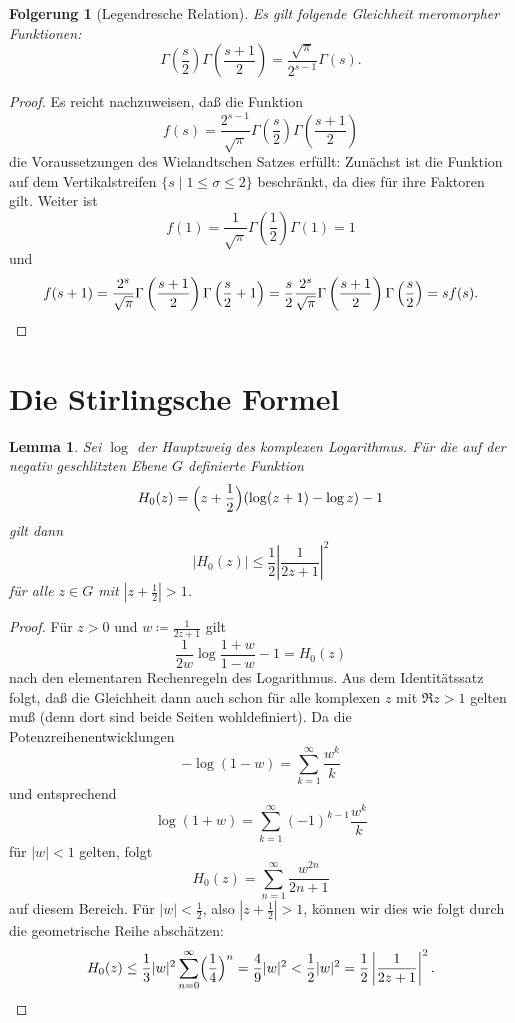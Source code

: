 \documentclass[a4paper,twoside,openright]{report}
\newtheorem{lem}[thm]{Lemma}
\newtheorem{cor}[thm]{Folgerung}
\theoremstyle{definition}
\theoremstyle{remark}
\begin{document}
\begin{cor}[Legendresche Relation]
  Es gilt folgende Gleichheit meromorpher Funktionen:
  \[
    \Gamma\left(\frac s 2\right) \Gamma\left(\frac{s + 1} 2\right) = \frac{\sqrt\pi}{2^{s - 1}} \Gamma(s).
  \]
\end{cor}

\begin{proof}
  Es reicht nachzuweisen, daß die Funktion
  \[
    f(s) = \frac{2^{s - 1}}{\sqrt{\pi}} \Gamma\left(\frac s 2\right) \Gamma\left(\frac{s + 1} 2\right)
  \]
  die Voraussetzungen des Wielandtschen Satzes erfüllt: Zunächst ist die Funktion
  auf dem Vertikalstreifen $\{s \mid 1 \leq \sigma \leq 2\}$ beschränkt, da dies
  für ihre Faktoren gilt. Weiter ist
  \[
    f(1) = \frac 1 {\sqrt\pi} \Gamma\left(\frac 1 2\right) \Gamma(1) = 1
  \]
  und
  \[
    f(s + 1) = \frac{2^s}{\sqrt{\pi}} \Gamma\left(\frac {s + 1} 2\right)
    \Gamma\left(\frac s 2 + 1\right)
    = \frac s 2 \frac{2^s}{\sqrt{\pi}} \Gamma\left(\frac {s + 1} 2\right)
    \Gamma\left(\frac s 2\right) = s f(s).
    \qedhere
  \]
\end{proof}

\section{Die Stirlingsche Formel}

\begin{lem}
  \label{lem:gudermann}
  Sei $\log$ der Hauptzweig des komplexen Logarithmus. Für die auf der negativ
  geschlitzten Ebene $G$ definierte Funktion 
  \[
    H_0(z) = \Bigl(z + \frac 1 2\Bigr) (\log (z + 1) - \log z) - 1
  \]
  gilt dann
  \[
    |H_0(z)| \leq \frac 1 2 \left| \frac 1 {2 z + 1} \right|^2
  \]
  für alle $z \in G$ mit
  $\left|z + \frac 1 2\right| > 1$.
\end{lem}

\begin{proof}
  Für $z > 0$ und $w \coloneqq \frac 1 {2 z + 1}$ gilt
  \[
    \frac 1 {2w} \log \frac{1 + w}{1 - w} - 1 = H_0(z)
  \]
  nach den elementaren Rechenregeln des Logarithmus. Aus dem Identitätssatz
  folgt, daß die Gleichheit dann auch schon für alle komplexen $z$ mit $\Re z > 1$
  gelten muß (denn dort sind beide Seiten wohldefiniert). Da die
  Potenzreihenentwicklungen
  \[
    - \log (1 - w) = \sum_{k = 1}^\infty \frac {w^k}{k}
  \]
  und entsprechend
  \[
    \log (1 + w) = \sum_{k = 1}^\infty (-1)^{k - 1} \frac{w^k}{k}
  \]
  für $|w| < 1$ gelten, folgt
  \[
    H_0(z) = \sum_{n = 1}^\infty \frac{w^{2n}}{2n + 1}
  \]
  auf diesem Bereich. Für $|w| < \frac 1 2$, also $\left|z + \frac 1 2\right| > 1$,
  können wir dies wie folgt durch
  die geometrische Reihe abschätzen:
  \[
    H_0(z) \leq \frac 1 3 |w|^2 \sum_{n = 0}^\infty \Bigl(\frac 1 4\Bigr)^n
    = \frac 4 9 |w|^2 < \frac 1 2 |w|^2 = \frac 1 2 \left|\frac 1 {2 z + 1}\right|^2.
  \]
\end{proof}
\end{document}

